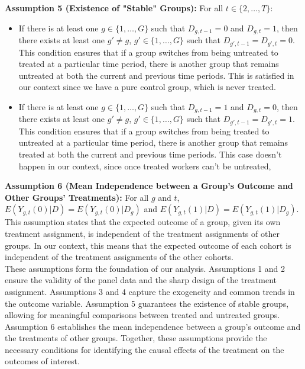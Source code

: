 \documentclass[oneside,11pt]{article}
\begin{document}
\textbf{Assumption 5 (Existence of "Stable" Groups):} For all $t \in \{2, \ldots, T\}$:
\begin{itemize}
    \item If there is at least one $g \in \{1, \ldots, G\}$ such that $D_{g,t-1} = 0$ and $D_{g,t} = 1$, then there exists at least one $g' \neq g$, $g' \in \{1, \ldots, G\}$ such that $D_{g',t-1} = D_{g',t} = 0$. This condition ensures that if a group switches from being untreated to treated at a particular time period, there is another group that remains untreated at both the current and previous time periods. This is satisfied in our context since we have a pure control group, which is never treated.
    \item If there is at least one $g \in \{1, \ldots, G\}$ such that $D_{g,t-1} = 1$ and $D_{g,t} = 0$, then there exists at least one $g' \neq g$, $g' \in \{1, \ldots, G\}$ such that $D_{g',t-1} = D_{g',t} = 1$. This condition ensures that if a group switches from being treated to untreated at a particular time period, there is another group that remains treated at both the current and previous time periods. This case doesn't happen in our context, since once treated workers can't be untreated,
\end{itemize}

\textbf{Assumption 6 (Mean Independence between a Group's Outcome and Other Groups' Treatments):} For all $g$ and $t$, $E(Y_{g,t}(0)|D) = E(Y_{g,t}(0)|D_g)$ and $E(Y_{g,t}(1)|D) = E(Y_{g,t}(1)|D_g)$. This assumption states that the expected outcome of a group, given its own treatment assignment, is independent of the treatment assignments of other groups. In our context, this means that the expected outcome of each cohort is independent of the treatment assignments of the other cohorts. \\

These assumptions form the foundation of our analysis. Assumptions 1 and 2 ensure the validity of the panel data and the sharp design of the treatment assignment. Assumptions 3 and 4 capture the exogeneity and common trends in the outcome variable. Assumption 5 guarantees the existence of stable groups, allowing for meaningful comparisons between treated and untreated groups. Assumption 6 establishes the mean independence between a group's outcome and the treatments of other groups. Together, these assumptions provide the necessary conditions for identifying the causal effects of the treatment on the outcomes of interest. 


\end{document}
